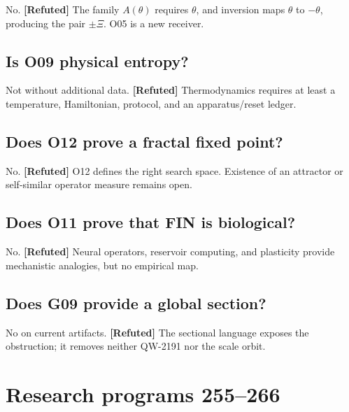 \documentclass[11pt,a4paper,openany]{report}
\newcommand{\statusRefuted}{\textcolor{finred}{[Refuted]}}
\begin{document}
No. \textbf{\statusRefuted{}} The family \(A(\theta)\) requires \(\theta\), and inversion maps \(\theta\) to \(-\theta\), producing the pair \(\pm\Xi\). O05 is a new receiver.

\section{Is O09 physical entropy?}

Not without additional data. \textbf{\statusRefuted{}} Thermodynamics requires at least a temperature, Hamiltonian, protocol, and an apparatus/\allowbreak{}reset ledger.

\section{Does O12 prove a fractal fixed point?}

No. \textbf{\statusRefuted{}} O12 defines the right search space. Existence of an attractor or self-similar operator measure remains open.

\section{Does O11 prove that FIN is biological?}

No. \textbf{\statusRefuted{}} Neural operators, reservoir computing, and plasticity provide mechanistic analogies, but no empirical map.

\section{Does G09 provide a global section?}

No on current artifacts. \textbf{\statusRefuted{}} The sectional language exposes the obstruction; it removes neither QW-2191 nor the scale orbit.

\chapter{Research programs 255--266}
\end{document}
